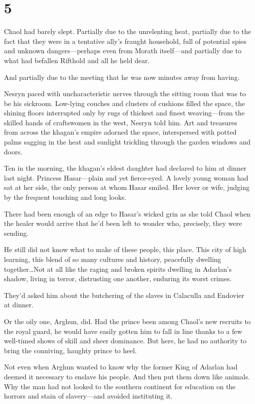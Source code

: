
\chapter{5}

Chaol had barely slept. Partially due to the unrelenting heat, partially due to the fact that they were in a tentative ally's fraught household, full of potential spies and unknown dangers---perhaps even from Morath itself---and partially due to what had befallen Rifthold and all he held dear.

And partially due to the meeting that he was now minutes away from having.

Nesryn paced with uncharacteristic nerves through the sitting room that was to be his sickroom. Low-lying couches and clusters of cushions filled the space, the shining floors interrupted only by rugs of thickest and finest weaving---from the skilled hands of craftswomen in the west, Nesryn told him. Art and treasures from across the khagan's empire adorned the space, interspersed with potted palms sagging in the heat and sunlight trickling through the garden windows and doors.

Ten in the morning, the khagan's eldest daughter had declared to him at dinner last night. Princess Hasar---plain and yet fierce-eyed. A lovely young woman had sat at her side, the only person at whom Hasar smiled. Her lover or wife, judging by the frequent touching and long looks.

There had been enough of an edge to Hasar's wicked grin as she told Chaol when the healer would arrive that he'd been left to wonder who, precisely, they were sending.

He still did not know what to make of these people, this place. This city of high learning, this blend of so many cultures and history, peacefully dwelling together\ldots Not at all like the raging and broken spirits dwelling in Adarlan's shadow, living in terror, distrusting one another, enduring its worst crimes.

They'd asked him about the butchering of the slaves in Calaculla and Endovier at dinner.

Or the oily one, Arghun, did. Had the prince been among Chaol's new recruits to the royal guard, he would have easily gotten him to fall in line thanks to a few well-timed shows of skill and sheer dominance. But here, he had no authority to bring the conniving, haughty prince to heel.

Not even when Arghun wanted to know why the former King of Adarlan had deemed it necessary to enslave his people. And then put them down like animals. Why the man had not looked to the southern continent for education on the horrors and stain of slavery---and avoided instituting it.

